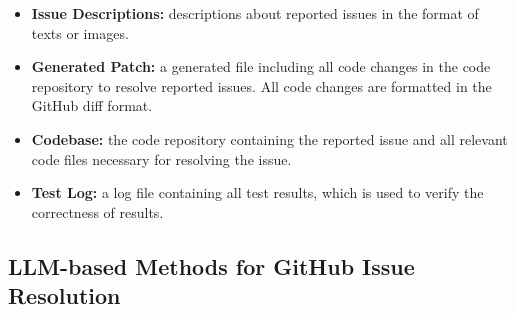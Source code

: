 \begin{itemize}%
    \item \textbf{Issue Descriptions:} descriptions about reported issues in the format of texts or images. 
    \item \textbf{Generated Patch:} a generated file including all code changes in the code repository to resolve reported issues. All code changes are formatted in the GitHub diff format.
    \item \textbf{Codebase:} the code repository containing the reported issue and all relevant code files necessary for resolving the issue.
    \item \textbf{Test Log:} a log file containing all test results, which is used to verify the correctness of results.
\end{itemize}








\subsection{LLM-based Methods for GitHub Issue Resolution}
\label{sec:methodBackground}


